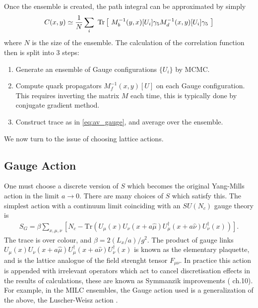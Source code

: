 \\ \\
Once the ensemble is created, the path integral can be approximated by simply
\begin{align}
  C(x,y) \simeq {1\over N} \sum_i \text{ Tr}\left[\text{ } M^{-1}_b(y,x)[U_i] \gamma_5 M^{-1}_d(x,y)[U_i] \gamma_5 \text{ }\right]
  \label{eq:av_gauge}
\end{align}
where $N$ is the size of the ensemble. The calculation of the correlation function then is split into 3 steps:
\begin{enumerate}
	\item
	Generate an ensemble of Gauge configurations $\{ U_i \}$ by MCMC.
	\item
	Compute quark propagators $M^{-1}_f(x,y)[U]$ on each Gauge configuration. This requires inverting the matrix $M$ each time, this is typically done by conjugate gradient method.
	\item
	Construct trace as in \eqref{eq:av_gauge}, and average over the ensemble.
\end{enumerate}
We now turn to the issue of choosing lattice actions.

\subsection{Gauge Action}
\label{sec:gauge}

One must choose a discrete version of $S$ which becomes the original Yang-Mills action in the limit $a\to0$. There are many choices of $S$ which satisfy this. The simplest action with a continuum limit coinciding with an $SU(N_c)$ gauge theory is
\begin{align}
   S_G = \beta \sum_{x,\mu,\nu} \left[ N_c - \text{Tr}\left( U_{\mu}(x) U_{\nu}(x+a\hat{\mu}) U^{\dagger}_{\mu}(x+a\hat{\nu}) U^{\dagger}_{\nu}(x) \right)  \right].
\end{align}
The trace is over colour, and $\beta = 2(L_x/a)/g^2$. The product of gauge links $U_{\mu}(x) U_{\nu}(x+a\hat{\mu}) U^{\dagger}_{\mu}(x+a\hat{\nu})U^{\dagger}_{\nu}(x)$ is known as the elementary plaquette, and is the lattice analogue of the field strenght tensor $F_{\mu\nu}$.
In practice this action is appended with irrelevant operators which act to cancel discretisation effects in the results of calculations, these are known as Symmanzik improvements (\cite{DeGrand:2006zz} ch.10). 
For example, in the MILC ensembles, the Gauge action used is a generalization of the above, the Luscher-Weisz action \cite{Gattringer:2001ia}.

